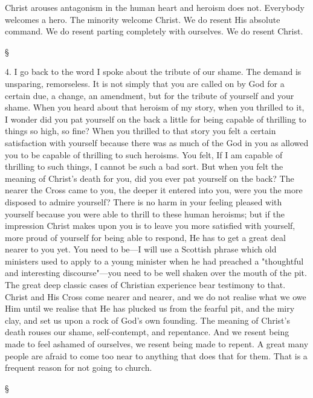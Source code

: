 \documentclass[12pt,letterpaper,oneside]{book}
\begin{document}
Christ arouses antagonism in the human heart 
and heroism does not. Everybody welcomes a 
hero. The minority welcome Christ. We do 
resent His absolute command. We do resent 
parting completely with ourselves. We do 
resent Christ. 

\begin{center} \S \end{center} 

4. I go back to the word I spoke about the 
tribute of our shame. The demand is unsparing, 
remorseless. It is not simply that you 
are called on by God for a certain due, a 
change, an amendment, but for the tribute of 
yourself and your shame. When you heard 
about that heroism of my story, when you 
thrilled to it, I wonder did you pat yourself on 
the back a little for being capable of thrilling 
to things so high, so fine? When you thrilled 
to that story you felt a certain satisfaction with 
yourself because there was as much of the God 
in you as allowed you to be capable of thrilling 
to such heroisms. You felt, If I am capable of 
thrilling to such things, I cannot be such a bad 
sort. But when you felt the meaning of 
Christ's death for you, did you ever pat yourself 
on the back? The nearer the Cross came to 
you, the deeper it entered into you, were you 
the more disposed to admire yourself? There is 
no harm in your feeling pleased with yourself 
because you were able to thrill to these human 
heroisms; but if the impression Christ makes 
upon you is to leave you more satisfied with 
yourself, more proud of yourself for being able
to respond, He has to get a great deal nearer to 
you yet. You need to be---I will use a Scottish 
phrase which old ministers used to apply to 
a young minister when he had preached a 
"thoughtful and interesting discourse"---you 
need to be well shaken over the mouth of the 
pit. The great deep classic cases of Christian 
experience bear testimony to that. Christ and 
His Cross come nearer and nearer, and we do 
not realise what we owe Him until we realise 
that He has plucked us from the fearful pit, 
and the miry clay, and set us upon a rock of 
God's own founding. The meaning of Christ's 
death rouses our shame, self-contempt, and 
repentance. And we resent being made to feel 
ashamed of ourselves, we resent being made to 
repent. A great many people are afraid to 
come too near to anything that does that for 
them. That is a frequent reason for not going 
to church. 

\begin{center} \S \end{center} 
\end{document}

